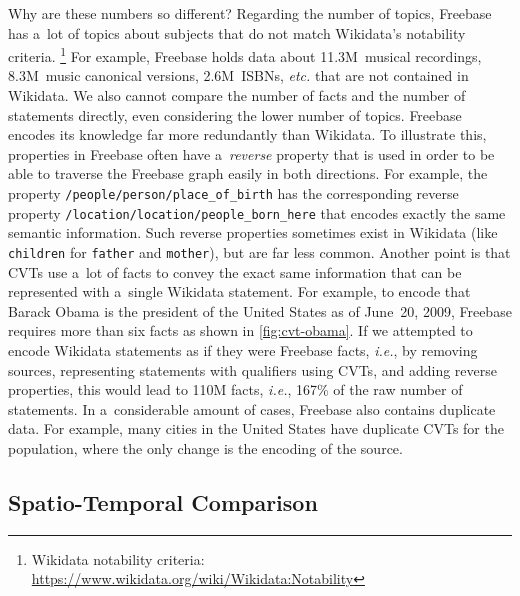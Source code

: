 \documentclass{acm_proc_article-sp}
\begin{document}
Why are these numbers so different?
Regarding the number of topics, Freebase has a~lot of topics about subjects
that do not match Wikidata's notability criteria.%
\footnote{Wikidata notability criteria:
\url{https://www.wikidata.org/wiki/Wikidata:Notability}}
For example, Freebase holds data about 11.3M~musical recordings,
8.3M~music canonical versions, 2.6M~ISBNs, \emph{etc.} that are not contained in Wikidata.
We also cannot compare the number of facts and the number of statements directly,
even considering the lower number of topics.
Freebase encodes its knowledge far more redundantly than Wikidata.
To illustrate this, properties in Freebase often have a~\emph{reverse} property
that is used in order to be able to traverse the Freebase graph easily in both directions.
For example, the property \texttt{/people/person/place\_of\_birth} has the corresponding
reverse property \texttt{/location/location/people\_born\_here}
that encodes exactly the same semantic information.
Such reverse properties sometimes exist in Wikidata
(like \texttt{children} for \texttt{father} and \texttt{mother}),
but are far less common.
Another point is that CVTs use a~lot of facts to convey the exact same information
that can be represented with a~single Wikidata statement.
For example, to encode that Barack Obama is the president
of the United States as of June~20, 2009,
Freebase requires more than six facts as shown in \autoref{fig:cvt-obama}.
If we attempted to encode Wikidata statements as if they were Freebase facts, \emph{i.e.},
by removing sources, representing statements with qualifiers using CVTs,
and adding reverse properties, this would lead to 110M facts,
\emph{i.e.}, 167\% of the raw number of statements.
In a~considerable amount of cases, Freebase also contains duplicate data.
For example, many cities in the United States have duplicate CVTs for the population,
where the only change is the encoding of the source.

\subsection{Spatio-Temporal Comparison}
\end{document}
